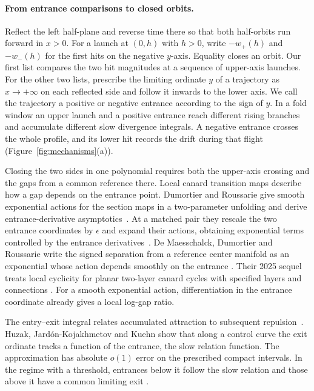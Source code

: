 \documentclass[11pt]{article}
\begin{document}
\paragraph{From entrance comparisons to closed orbits.}
Reflect the left half-plane and reverse time there so that both
half-orbits run forward in $x>0$. For a launch at $(0,h)$ with $h>0$,
write $-w_+(h)$ and $-w_-(h)$ for the first hits on the negative
$y$-axis. Equality closes an orbit. Our first list compares the two
hit magnitudes at a sequence of upper-axis launches. For the other
two lists, prescribe the limiting ordinate $y$ of a trajectory as
$x\to+\infty$ on each reflected side and follow it inwards to the
lower axis. We call the trajectory a positive or negative entrance
according to the sign of $y$. In a fold window an upper launch and a
positive entrance reach different rising branches and accumulate
different slow divergence integrals. A negative entrance crosses the
whole profile, and its lower hit records the drift during that flight
(Figure~\ref{fig:mechanisms}(a)).

Closing the two sides in one polynomial requires both the upper-axis
crossing and the gaps from a common reference there. Local canard
transition maps describe how a gap depends on the entrance point.
Dumortier and Roussarie give smooth exponential
actions for the section maps in a two-parameter unfolding and derive
entrance-derivative asymptotics~\cite[\S2, Definition~2.1, (5)--(7),
Remark~5.2]{DR2007}. At a matched pair they rescale the two entrance coordinates by $\epsilon$ and expand their actions, obtaining exponential terms controlled by the entrance derivatives~\cite[\S6, (22)--(24)]{DR2007}. De Maesschalck, Dumortier and Roussarie write the
signed separation from a reference center manifold as an exponential
whose action depends smoothly on the entrance
\cite[\S2.3, (1)]{DMDR2023}. Their 2025 sequel treats local cyclicity
for planar two-layer canard cycles with specified layers and connections
\cite[p.~1]{DMDR2025}. For a smooth exponential action, differentiation
in the entrance coordinate already gives a local log-gap ratio.

The entry--exit integral relates accumulated attraction to subsequent
repulsion~\cite[(1.4)]{DMS2016}. Huzak, Jard\'on-Kojakhmetov and Kuehn
show that along a control curve the exit ordinate tracks a function
of the entrance, the slow relation function. The approximation has absolute $o(1)$ error on the prescribed compact
intervals. In the regime with a threshold, entrances below it follow
the slow relation and those above it have a common limiting exit
\cite[author version~2, Proposition~2]{HJK2025}.
\end{document}
